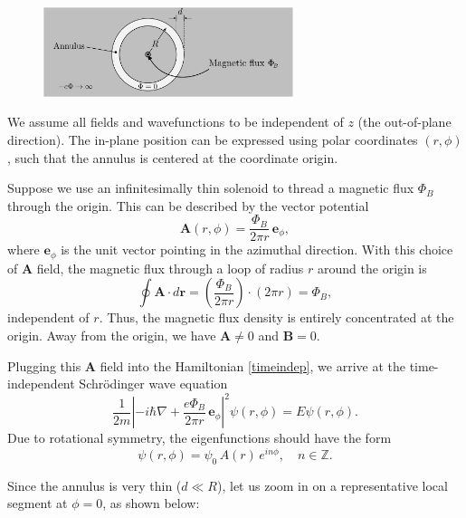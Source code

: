 \documentclass[prx,12pt]{revtex4-2}
\begin{document}
\begin{figure}[h]
  \centering\includegraphics[width=0.65\textwidth]{annulus}
\end{figure}

\noindent
We assume all fields and wavefunctions to be independent of $z$ (the
out-of-plane direction).  The in-plane position can be expressed using
polar coordinates $(r,\phi)$, such that the annulus is centered at the
coordinate origin.

Suppose we use an infinitesimally thin solenoid to thread a magnetic
flux $\Phi_B$ through the origin.  This can be described by the vector
potential
\begin{equation}
  \mathbf{A}(r,\phi) = \frac{\Phi_B}{2\pi r} \, \mathbf{e}_\phi,
  \label{Asolenoid}
\end{equation}
where $\mathbf{e}_\phi$ is the unit vector pointing in the azimuthal
direction.  With this choice of $\mathbf{A}$ field, the magnetic flux
through a loop of radius $r$ around the origin is
\begin{equation}
  \oint \mathbf{A} \cdot d\mathbf{r} = \left(\frac{\Phi_B}{2\pi r}\right)
  \cdot (2\pi r)
  = \Phi_B,
\end{equation}
independent of $r$.  Thus, the magnetic flux density is entirely
concentrated at the origin.  Away from the origin, we have $\mathbf{A}
\ne 0$ and $\mathbf{B} = 0$.

Plugging this $\mathbf{A}$ field into the Hamiltonian
\eqref{timeindep}, we arrive at the time-independent Schr\"odinger
wave equation
\begin{equation}
  \frac{1}{2m}\left|-i\hbar\nabla+
  \frac{e\Phi_B}{2\pi r} \, \mathbf{e}_\phi\right|^2 \psi(r,\phi)
  = E\psi(r,\phi).
  \label{ABschrod}
\end{equation}
Due to rotational symmetry, the eigenfunctions should have the form
\begin{equation}
  \psi(r,\phi) = \psi_0 \, A(r)\, e^{in\phi}, \quad n \in \mathbb{Z}.
  \label{abansatz}
\end{equation}

Since the annulus is very thin ($d \ll R$), let us zoom in on a
representative local segment at $\phi = 0$, as shown below:
\end{document}
